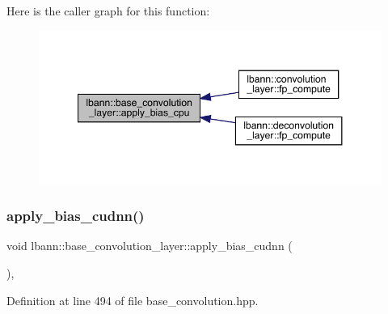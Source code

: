Here is the caller graph for this function\+:\nopagebreak
\begin{figure}[H]
\begin{center}
\leavevmode
\includegraphics[width=348pt]{classlbann_1_1base__convolution__layer_a4f792e1c19d4591f305880b57f63cec3_icgraph}
\end{center}
\end{figure}
\mbox{\label{classlbann_1_1base__convolution__layer_aa33e490222597c4c5203d94061ae9d88}} 
\subsubsection{\texorpdfstring{apply\+\_\+bias\+\_\+cudnn()}{apply\_bias\_cudnn()}}
{\footnotesize\ttfamily void lbann\+::base\+\_\+convolution\+\_\+layer\+::apply\+\_\+bias\+\_\+cudnn (\begin{DoxyParamCaption}{ }\end{DoxyParamCaption})\hspace{0.3cm}{\ttfamily [inline]}, {\ttfamily [protected]}}



Definition at line 494 of file base\+\_\+convolution.\+hpp.


